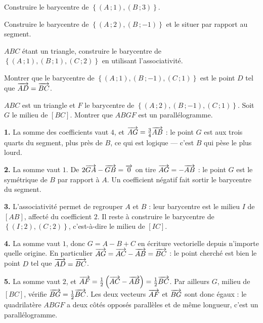 \begin{entrainement}
\exo[\niveau{1}] Construire le barycentre de
$\left\{(A\,;1),(B\,;3)\right\}$.

\exo[\niveau{1}] Construire le barycentre de
$\left\{(A\,;2),(B\,;-1)\right\}$ et le situer par rapport au segment.

\exo[\niveau{2}] $ABC$ étant un triangle, construire le barycentre de
$\left\{(A\,;1),(B\,;1),(C\,;2)\right\}$ en utilisant l'associativité.

\exo[\niveau{2}] Montrer que le barycentre de
$\left\{(A\,;1),(B\,;-1),(C\,;1)\right\}$ est le point $D$ tel que
$\overrightarrow{AD} = \overrightarrow{BC}$.

\exo[\niveau{3}] $ABC$ est un triangle et $F$ le barycentre de
$\left\{(A\,;2),(B\,;-1),(C\,;1)\right\}$. Soit $G$ le milieu de $[BC]$.
Montrer que $ABGF$ est un parallélogramme.
\end{entrainement}

\begin{corrige}
\textbf{1.} La somme des coefficients vaut $4$, et
$\overrightarrow{AG} = \frac34\overrightarrow{AB}$ : le point $G$ est aux trois quarts du segment,
plus près de $B$, ce qui est logique — c'est $B$ qui pèse le plus lourd.

\textbf{2.} La somme vaut $1$. De $2\overrightarrow{GA}-\overrightarrow{GB} = \overrightarrow{0}$ on tire
$\overrightarrow{AG} = -\overrightarrow{AB}$ : le point $G$ est le symétrique de $B$ par rapport à
$A$. Un coefficient négatif fait sortir le barycentre du segment.

\textbf{3.} L'associativité permet de regrouper $A$ et $B$ : leur barycentre
est le milieu $I$ de $[AB]$, affecté du coefficient $2$. Il reste à construire
le barycentre de $\left\{(I\,;2),(C\,;2)\right\}$, c'est-à-dire le milieu de
$[IC]$.

\textbf{4.} La somme vaut $1$, donc $G = A-B+C$ en écriture vectorielle
depuis n'importe quelle origine. En particulier
$\overrightarrow{AG} = \overrightarrow{AC}-\overrightarrow{AB} = \overrightarrow{BC}$ : le point cherché est bien le
point $D$ tel que $\overrightarrow{AD} = \overrightarrow{BC}$.

\textbf{5.} La somme vaut $2$, et
$\overrightarrow{AF} = \frac12\left(\overrightarrow{AC}-\overrightarrow{AB}\right) = \frac12\overrightarrow{BC}$.
Par ailleurs $G$, milieu de $[BC]$, vérifie $\overrightarrow{BG} = \frac12\overrightarrow{BC}$.
Les deux vecteurs $\overrightarrow{AF}$ et $\overrightarrow{BG}$ sont donc égaux : le quadrilatère
$ABGF$ a deux côtés opposés parallèles et de même longueur, c'est un
parallélogramme.
\end{corrige}

